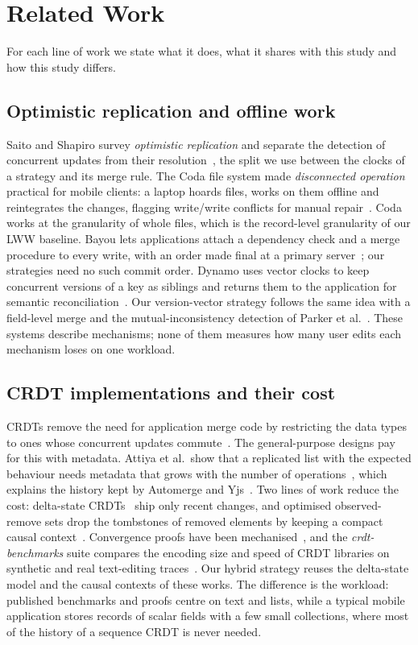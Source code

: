 \section{Related Work}\label{sec:related}

For each line of work we state what it does, what it shares with this study and how this study differs.

\subsection{Optimistic replication and offline work}
Saito and Shapiro survey \emph{optimistic replication} and separate the detection of concurrent updates from their
resolution~\cite{saito2005optimistic}, the split we use between the clocks of a strategy and its merge rule. The Coda file system made
\emph{disconnected operation} practical for mobile clients: a laptop hoards files, works on them offline and
reintegrates the changes, flagging write/write conflicts for manual repair~\cite{kistler1992coda}. Coda works at the
granularity of whole files, which is the record-level granularity of our LWW baseline. Bayou lets applications attach a
dependency check and a merge procedure to every write, with an order made final at a primary
server~\cite{terry1995bayou}; our strategies need no such commit order. Dynamo uses vector clocks to keep
concurrent versions of a key as siblings and returns them to the application for semantic
reconciliation~\cite{decandia2007dynamo}. Our version-vector strategy follows the same
idea with a field-level merge and the mutual-inconsistency detection of Parker et al.~\cite{parker1983detection}.
These systems describe mechanisms; none of them measures how many user edits each mechanism loses on one workload.

\subsection{CRDT implementations and their cost}
CRDTs remove the need for application merge code by restricting the data types to ones whose concurrent updates
commute~\cite{shapiro2011crdt,shapiro2011comprehensive,preguica2018overview}. The general-purpose designs pay for
this with metadata. Attiya et al.\ show that a replicated list with the expected behaviour needs metadata that grows
with the number of operations~\cite{attiya2016editing}, which explains the history kept by Automerge and
Yjs~\cite{kleppmann2017json,nicolaescu2016yjs}. Two lines of work reduce the cost: delta-state
CRDTs~\cite{almeida2018delta} ship only recent changes, and optimised observed-remove sets drop the tombstones of
removed elements by keeping a compact causal context~\cite{bieniusa2012orset}. Convergence proofs have been
mechanised~\cite{gomes2017verifying}, and the \emph{crdt-benchmarks} suite compares the encoding
size and speed of CRDT libraries on synthetic and real text-editing traces~\cite{crdtbenchmarks}. Our hybrid strategy
reuses the delta-state model and the causal contexts of these works. The difference is the workload: published
benchmarks and proofs centre on text and lists, while a typical mobile application stores records of scalar fields
with a few small collections, where most of the history of a sequence CRDT is never needed.

